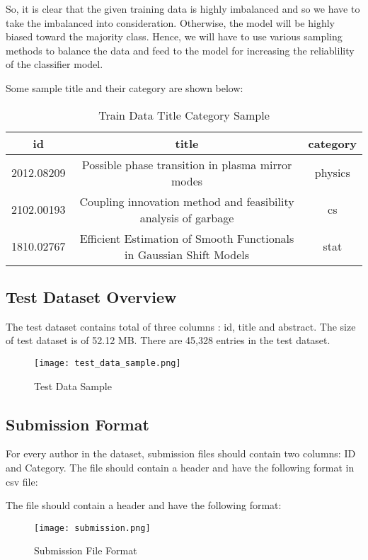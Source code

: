 So, it is clear that the given training data is highly imbalanced and so we have to take the imbalanced into consideration. Otherwise, the model will be highly biased toward the majority class. Hence, we will have to use various sampling methods to balance the data and feed to the model for increasing the reliablility of the classifier model.

Some sample title and their category are shown below:
\begin{table}[H]
    \begin{center}
        \begin{tabular}{ |c|c|c| }
            \hline
            id         & title                                                               & category \\
            \hline
            2012.08209 & Possible phase transition in plasma mirror modes
                       & physics                                                                        \\

            \hline
            2102.00193 & Coupling innovation method and feasibility analysis of garbage
                       & cs                                                                             \\

            \hline
            1810.02767 & Efficient Estimation of Smooth Functionals in Gaussian Shift Models & stat     \\
            \hline
        \end{tabular}
    \end{center}
    \caption{Train Data Title Category Sample}
    \label{table:Train Data Title Category Sample}
\end{table}

\subsection{Test Dataset Overview}
The test dataset contains total of three columns : id, title and abstract. The size of test dataset is of 52.12 MB. There are 45,328 entries in the test dataset. 

\begin{figure}[H]
    \centering
    \texttt{[image: test\_data\_sample.png]}
    \caption{Test Data Sample}
    \label{fig:Test Data Sample}
\end{figure}

\subsection{Submission Format}
For every author in the dataset, submission files should contain two columns: ID and Category. The file should contain a header and have the following format in csv file:

The file should contain a header and have the following format:

\begin{figure}[H]
    \centering
    \texttt{[image: submission.png]}
    \caption{Submission File Format}
    \label{fig:Submission File Format}
\end{figure}